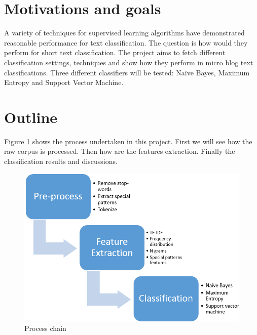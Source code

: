 
\section{Motivations and goals}
A variety of techniques for supervised learning algorithms have demonstrated reasonable performance for text classification. The question is how would they perform for short text classification.
The project aims to fetch different classification settings, techniques and show how they perform in micro blog text classifications. 
Three different classifiers will be tested: Naïve Bayes, Maximum Entropy and Support Vector Machine.


\section{Outline}
Figure \ref{fig:process_chain} shows the process undertaken in this project.
First we will see how the raw corpus is processed. Then how are the features extraction. Finally the classification results and discussions. 
\begin{figure}[H]
  \centering
  \includegraphics[width=150mm]{figures/process_chain.png}
  \caption{Process chain \label{fig:process_chain}}
\end{figure}